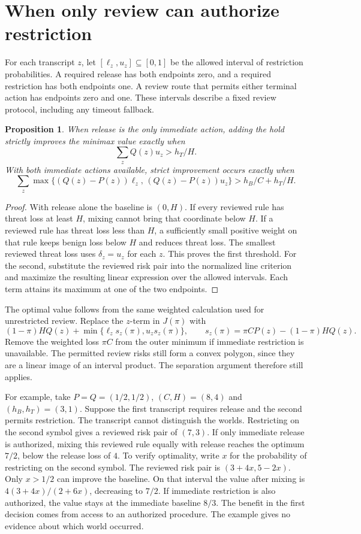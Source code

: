 \documentclass[11pt]{article}
\newtheorem{proposition}{Proposition}
\begin{document}
\section{When only review can authorize restriction}
For each transcript $z$, let $[\ell_z,u_z]\subseteq[0,1]$
be the allowed interval of restriction probabilities. A required
release has both endpoints zero, and a required restriction has
both endpoints one. A review route that permits either terminal
action has endpoints zero and one. These intervals describe a fixed
review protocol, including any timeout fallback.

\begin{proposition}
When release is the only immediate action, adding the hold
strictly improves the minimax value exactly when
\[
 \sum_z Q(z)u_z > h_T/H.
\]
With both immediate actions available, strict improvement occurs
exactly when
\[
 \sum_z\max\{(Q(z)-P(z))\ell_z,\,(Q(z)-P(z))u_z\}
       > h_B/C+h_T/H.
\]
\end{proposition}
\begin{proof}
With release alone the baseline is $(0,H)$. If every reviewed
rule has threat loss at least $H$, mixing cannot bring that
coordinate below $H$. If a reviewed rule has threat loss less
than $H$, a sufficiently small positive weight on that rule
keeps benign loss below $H$ and reduces threat loss. The smallest
reviewed threat loss uses $\delta_z=u_z$ for each $z$. This proves
the first threshold. For the second, substitute the reviewed risk
pair into the normalized line criterion and maximize the resulting
linear expression over the allowed intervals. Each term attains
its maximum at one of the two endpoints.
\end{proof}

The optimal value follows from the same weighted calculation used
for unrestricted review. Replace the $z$-term in $J(\pi)$ with
\[
 (1-\pi)H Q(z)+\min\{\ell_z s_z(\pi),u_z s_z(\pi)\},
 \qquad s_z(\pi)=\pi C P(z)-(1-\pi)H Q(z).
\]
Remove the weighted loss $\pi C$ from the outer minimum if
immediate restriction is unavailable. The permitted review risks
still form a convex polygon, since they are a linear image of
an interval product. The separation argument therefore still applies.

For example, take $P=Q=(1/2,1/2)$, $(C,H)=(8,4)$ and
$(h_B,h_T)=(3,1)$. Suppose the first transcript requires release
and the second permits restriction. The transcript cannot distinguish
the worlds. Restricting on the second symbol gives a reviewed risk
pair of $(7,3)$. If only immediate release is authorized, mixing
this reviewed rule equally with release reaches the optimum $7/2$,
below the release loss of $4$. To verify optimality, write $x$ for
the probability of restricting on the second symbol. The reviewed
risk pair is $(3+4x,5-2x)$. Only $x>1/2$ can improve the baseline.
On that interval the value after mixing is
$4(3+4x)/(2+6x)$, decreasing to $7/2$. If immediate restriction
is also authorized, the value stays at the immediate baseline $8/3$.
The benefit in the first decision comes from access to an authorized
procedure. The example gives no evidence about which world occurred.
\end{document}
